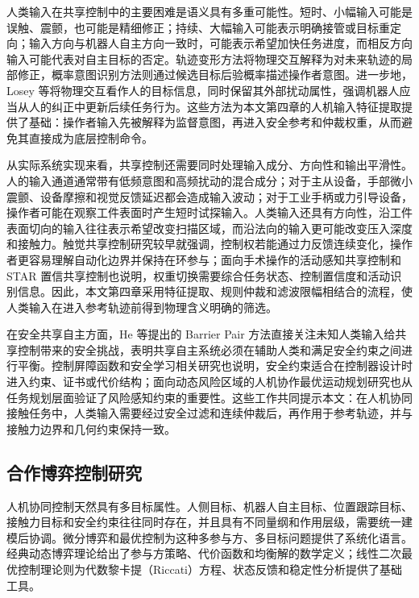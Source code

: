 人类输入在共享控制中的主要困难是语义具有多重可能性。短时、小幅输入可能是误触、震颤，也可能是精细修正；持续、大幅输入可能表示明确接管或目标重定向；输入方向与机器人自主方向一致时，可能表示希望加快任务进度，而相反方向输入可能代表对自主目标的否定。轨迹变形方法将物理交互解释为对未来轨迹的局部修正\cite{losey2018trajectory}，概率意图识别方法则通过候选目标后验概率描述操作者意图\cite{jain2020probabilistic}。进一步地，Losey 等将物理交互看作人的目标信息，同时保留其外部扰动属性，强调机器人应当从人的纠正中更新后续任务行为\cite{losey2022physicalcommunication}。这些方法为本文第四章的人机输入特征提取提供了基础：操作者输入先被解释为监督意图，再进入安全参考和仲裁权重，从而避免其直接成为底层控制命令。

从实际系统实现来看，共享控制还需要同时处理输入成分、方向性和输出平滑性。人的输入通道通常带有低频意图和高频扰动的混合成分；对于主从设备，手部微小震颤、设备摩擦和视觉反馈延迟都会造成输入波动；对于工业手柄或力引导设备，操作者可能在观察工件表面时产生短时试探输入。人类输入还具有方向性，沿工件表面切向的输入往往表示希望改变扫描区域，而沿法向的输入更可能改变压入深度和接触力。触觉共享控制研究较早就强调，控制权若能通过力反馈连续变化，操作者更容易理解自动化边界并保持在环参与\cite{abbink2011hapticshared}；面向手术操作的活动感知共享控制和 STAR 置信共享控制也说明，权重切换需要综合任务状态、控制置信度和活动识别信息\cite{su2022activityaware,saeidi2018starshared}。因此，本文第四章采用特征提取、规则仲裁和滤波限幅相结合的流程，使人类输入在进入参考轨迹前得到物理含义明确的筛选。


在安全共享自主方面，He 等提出的 Barrier Pair 方法直接关注未知人类输入给共享控制带来的安全挑战，表明共享自主系统必须在辅助人类和满足安全约束之间进行平衡\cite{he2021barrier}。控制屏障函数和安全学习相关研究也说明，安全约束适合在控制器设计时进入约束、证书或代价结构；面向动态风险区域的人机协作最优运动规划研究也从任务规划层面验证了风险感知约束的重要性\cite{ames2019cbf,xiao2019hocbf,dawson2021rnlbf,cohen2021safeexploration,brunke2022safelearning,li2025optimal}。这些工作共同提示本文：在人机协同接触任务中，人类输入需要经过安全过滤和连续仲裁后，再作用于参考轨迹，并与接触力边界和几何约束保持一致。

\subsection{合作博弈控制研究}
\label{subsec:ch1_game_control}

人机协同控制天然具有多目标属性。人侧目标、机器人自主目标、位置跟踪目标、接触力目标和安全约束往往同时存在，并且具有不同量纲和作用层级，需要统一建模后协调。微分博弈和最优控制为这种多参与方、多目标问题提供了系统化语言。经典动态博弈理论给出了参与方策略、代价函数和均衡解的数学定义\cite{basar1999dynamic,engwerda2005lqdg}；线性二次最优控制理论则为代数黎卡提（Riccati）方程、状态反馈和稳定性分析提供了基础工具\cite{anderson2007optimal}。

